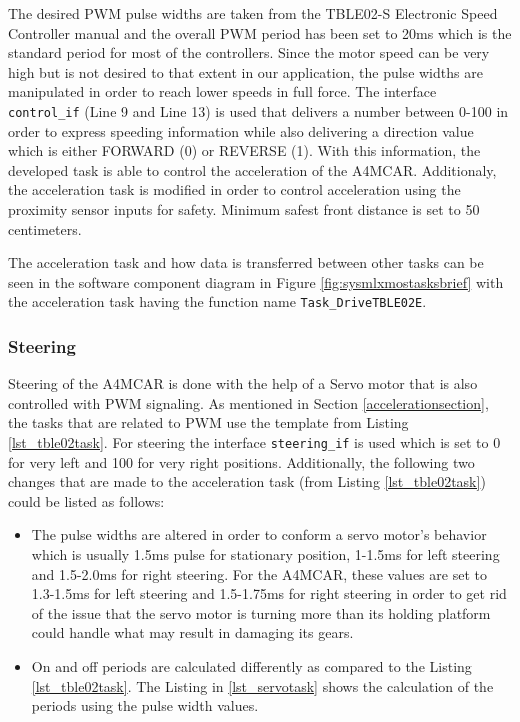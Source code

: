 
The desired PWM pulse widths are taken from the TBLE02-S Electronic Speed Controller manual and the overall PWM period has been set to 20ms which is the standard period for most of the controllers. Since the motor speed can be very high but is not desired to that extent in our application, the pulse widths are manipulated in order to reach lower speeds in full force. The interface \texttt{control\texttt{\_}if} (Line 9 and Line 13) is used that delivers a number between 0-100 in order to express speeding information while also delivering a direction value which is either FORWARD (0) or REVERSE (1). With this information, the developed task is able to control the acceleration of the A4MCAR. Additionaly, the acceleration task is modified in order to control acceleration using the proximity sensor inputs for safety. Minimum safest front distance is set to 50 centimeters.

The acceleration task and how data is transferred between other tasks can be seen in the software component diagram in Figure \ref{fig:sysmlxmostasksbrief} with the acceleration task having the function name \texttt{Task\texttt{\_}DriveTBLE02E}.

\subsubsection{Steering}
Steering of the A4MCAR is done with the help of a Servo motor that is also controlled with PWM signaling. As mentioned in Section \ref{accelerationsection}, the tasks that are related to PWM use the template from Listing \ref{lst_tble02task}. For steering the interface \texttt{steering\texttt{\_}if} is used which is set to 0 for very left and 100 for very right positions. Additionally, the following two changes that are made to the acceleration task (from Listing \ref{lst_tble02task}) could be listed as follows:
\begin{itemize}
	\item The pulse widths are altered in order to conform a servo motor's behavior which is usually 1.5ms pulse for stationary position, 1-1.5ms for left steering and 1.5-2.0ms for right steering. For the A4MCAR, these values are set to 1.3-1.5ms for left steering and 1.5-1.75ms for right steering in order to get rid of the issue that the servo motor is turning more than its holding platform could handle what may result in damaging its gears.
	\item On and off periods are calculated differently as compared to the Listing \ref{lst_tble02task}. The Listing in \ref{lst_servotask} shows the calculation of the periods using the pulse width values.
	
\end{itemize}

